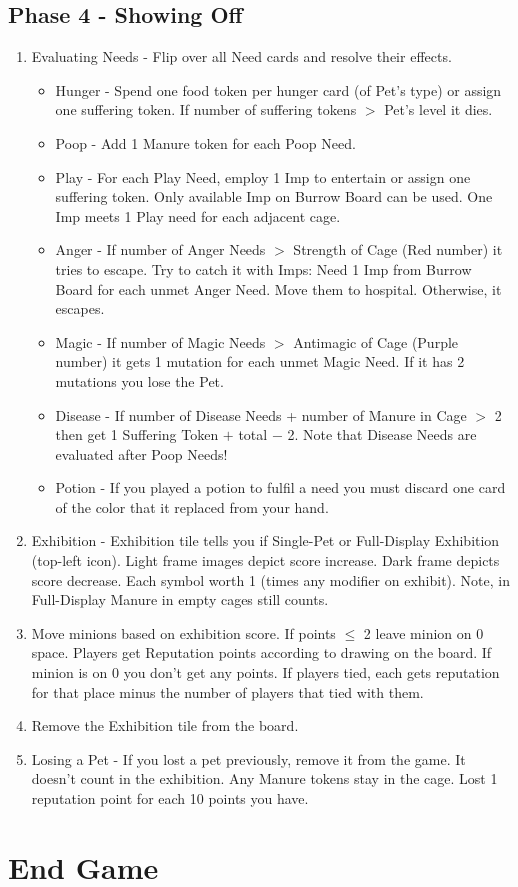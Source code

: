 \documentclass[12pt]{article}
\newenvironment{enumerateCustom}
{\begin{enumerate}
  \setlength{\itemsep}{1pt}
  \setlength{\parskip}{0pt}
  \setlength{\parsep}{0pt}}
{\end{enumerate}}
\newenvironment{itemizeCustom}
{\begin{itemize}
  \setlength{\itemsep}{1pt}
  \setlength{\parskip}{0pt}
  \setlength{\parsep}{0pt}}
{\end{itemize}}
\begin{document}
\begin{multicols*}{2}
\subsection*{Phase 4 - Showing Off}
\begin{enumerateCustom}
	\item Evaluating Needs - Flip over all Need cards and resolve their effects.
	\begin{itemizeCustom}
		\item Hunger - Spend one food token per hunger card (of Pet's type) or assign one suffering token. If number of suffering tokens $>$ Pet's level it dies.
		\item Poop - Add 1 Manure token for each Poop Need.
		\item Play - For each Play Need, employ 1 Imp to entertain or assign one suffering token. Only available Imp on Burrow Board can be used. One Imp meets 1 Play need for each adjacent cage.
		\item Anger - If number of Anger Needs $>$ Strength of Cage (Red number) it tries to escape. Try to catch it with Imps: Need 1 Imp from Burrow Board for each unmet Anger Need. Move them to hospital. Otherwise, it escapes.
		\item Magic - If number of Magic Needs $>$ Antimagic of Cage (Purple number) it gets 1 mutation for each unmet Magic Need. If it has 2 mutations you lose the Pet.
		\item Disease - If number of Disease Needs + number of Manure in Cage $>$ 2 then get 1 Suffering Token $+$ total $-$ 2. Note that Disease Needs are evaluated after Poop Needs!
		\item Potion - If you played a potion to fulfil a need you must discard one card of the color that it replaced from your hand.
	\end{itemizeCustom}
	\item Exhibition - Exhibition tile tells you if Single-Pet or Full-Display Exhibition (top-left icon). Light frame images depict score increase. Dark frame depicts score decrease. Each symbol worth 1 (times any modifier on exhibit). Note, in Full-Display Manure in empty cages still counts.
	\item Move minions based on exhibition score. If points $\le$ 2 leave minion on 0 space. Players get Reputation points according to drawing on the board. If minion is on 0 you don't get any points. If players tied, each gets reputation for that place minus the number of players that tied with them.
	\item Remove the Exhibition tile from the board.
	\item Losing a Pet - If you lost a pet previously, remove it from the game. It doesn't count in the exhibition. Any Manure tokens stay in the cage. Lost 1 reputation point for each 10 points you have.
\end{enumerateCustom}

\section*{End Game}

\end{multicols*}
\end{document}
